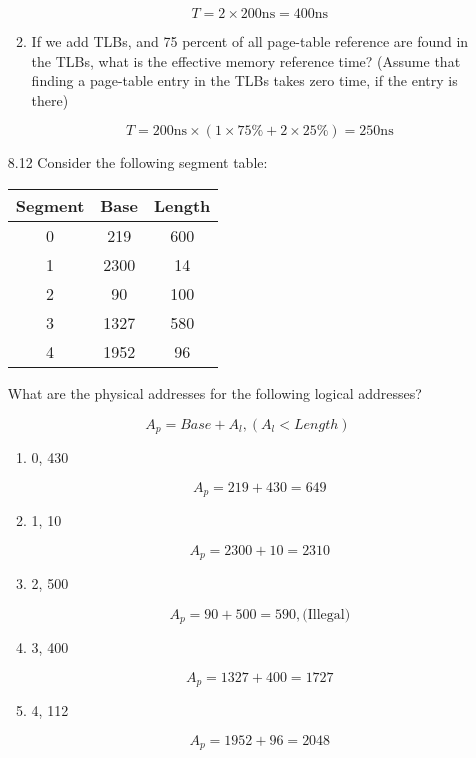 \begin{enumerate}
\begin{enumerate}
        $$ T = 2 \times 200 \text{ns} = 400 \text{ns} $$
        
        \item If we add TLBs, and 75 percent of all page-table reference are found in the TLBs, what is the effective memory reference time? (Assume that finding a page-table entry in the TLBs takes zero time, if the entry is there)
        
        $$ T = 200 \text{ns} \times ( 1 \times 75 \% + 2 \times 25\%) = 250 \text{ns} $$
        
    \end{enumerate}
    
    \item [8.12] Consider the following segment table:
    
    \begin{center}
    \begin{tabular}{|c|c|c|}
        \hline
        Segment & Base & Length \\
        \hline
        0 & 219 & 600 \\
        \hline
        1 & 2300 & 14 \\
        \hline
        2 & 90 & 100 \\
        \hline
        3 & 1327 & 580 \\
        \hline
        4 & 1952 & 96 \\
        \hline
    \end{tabular}
    \end{center}
    
    What are the physical addresses for the following logical addresses?
    
    $$ A_p = Base + A_l, (A_l < Length) $$
    
    \begin{enumerate}
        \item 0, 430
        
        $$ A_p = 219 + 430 = 649 $$
        
        \item 1, 10
        
        $$ A_p = 2300 + 10 = 2310 $$
        
        \item 2, 500
        
        $$ A_p = 90 + 500 = 590 , \text{(Illegal)} $$ 
        
        \item 3, 400
        
        $$ A_p = 1327 + 400 = 1727 $$
        
        \item 4, 112
        
        $$ A_p = 1952 + 96 = 2048 $$
        
    \end{enumerate}
    
\end{enumerate}

